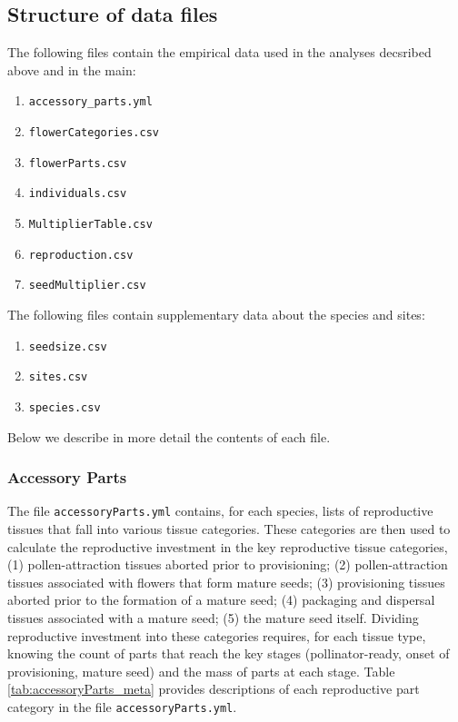 \documentclass[10pt,twoside]{article}\usepackage[]{graphicx}\usepackage[]{color}
\begin{document}
\clearpage

\subsection{Structure of data files}

The following files contain the empirical data used in the analyses decsribed above and in the main:

\begin{enumerate}
\item \texttt{accessory\_parts.yml}
\item \texttt{flowerCategories.csv}
\item \texttt{flowerParts.csv}
\item \texttt{individuals.csv}
\item \texttt{MultiplierTable.csv}
\item \texttt{reproduction.csv}
\item \texttt{seedMultiplier.csv}
\end{enumerate}
The following files contain supplementary data about the species and sites:
\begin{enumerate}
\item \texttt{seedsize.csv}
\item \texttt{sites.csv}
\item \texttt{species.csv}
\end{enumerate}

Below we describe in more detail the contents of each file.

\subsubsection{Accessory Parts}

The file \texttt{accessoryParts.yml} contains, for each species, lists of reproductive tissues that fall into various tissue categories. These categories are then used to calculate the reproductive investment in the key reproductive tissue categories, (1) pollen-attraction tissues aborted prior to provisioning; (2) pollen-attraction tissues associated with flowers that form mature seeds; (3) provisioning tissues aborted prior to the formation of a mature seed; (4) packaging and dispersal tissues associated with a mature seed; (5) the mature seed itself. Dividing reproductive investment into these categories requires, for each tissue type, knowing the count of parts that reach the key stages (pollinator-ready, onset of provisioning, mature seed) and the mass of parts at each stage. Table \ref{tab:accessoryParts_meta} provides descriptions of each reproductive part category in the file \texttt{accessoryParts.yml}.
\end{document}
